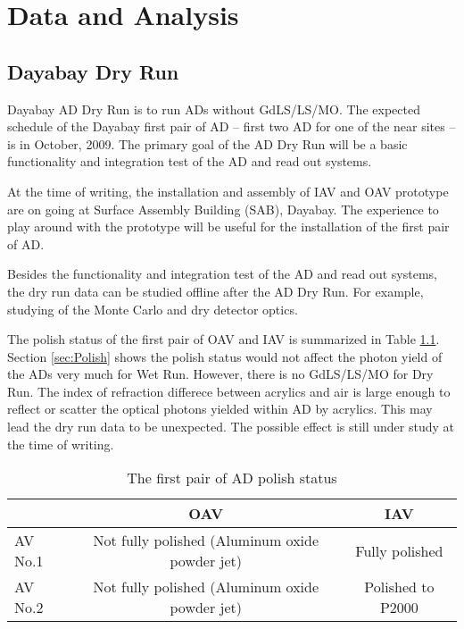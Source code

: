 \chapter {Data and Analysis}
\section {Dayabay Dry Run}

Dayabay AD Dry Run is to run ADs without GdLS/LS/MO.
The expected schedule of the Dayabay first pair of AD -- first two AD for one of the near sites --
is in October, 2009. The primary goal of the AD Dry Run will be a basic functionality and integration test of the AD and read out systems.

At the time of writing, the installation and assembly of IAV and OAV prototype are on going at Surface Assembly Building (SAB), Dayabay.
The experience to play around with the prototype will be useful for the installation of the first pair of AD.

Besides the functionality and integration test of the AD and read out systems, the dry run data can be studied offline
after the AD Dry Run. For example, studying of the Monte Carlo and dry detector optics.

The polish status of the first pair of OAV and IAV is summarized in Table \ref{tab:ADPolishStatus}.
Section \ref{sec:Polish} shows the polish status would not affect the photon yield of the ADs
very much for Wet Run. However, there is no GdLS/LS/MO for Dry Run. The index of refraction
differece between acrylics and air is large enough to reflect or scatter the optical photons
yielded within AD by acrylics. This may lead the dry run data to be unexpected.
The possible effect is still under study at the time of writing.


\begin{table}
\centering
\caption{The first pair of AD polish status}
\label{tab:ADPolishStatus}
\begin{tabular}{lcc}
\hline
 & OAV & IAV\\
\hline
\hline
AV No.1 &   Not fully polished (Aluminum oxide powder jet) &   Fully polished  \\
AV No.2 &   Not fully polished (Aluminum oxide powder jet) &   Polished to P2000   \\
\hline
\end{tabular}
\end{table}





